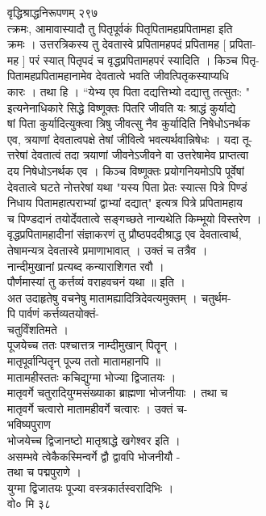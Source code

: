 \documentclass[11pt, openany]{book}
\begin{document}
{{{{{{{{ वृद्धिश्राद्धनिरूपणम् \textbar{} २९७\\
त्क्रमः, आमावास्यादौ तु पितृपूर्वकं पितृपितामहप्रपितामहा इति\\
क्रमः । उत्तरत्रिकस्य तु देवतास्वे प्रपितामहपदं प्रपितामह {[} प्रपिता-\\
मह {]} परं स्यात् पितृपदं च वृद्धप्रपितामहपरं स्यादिति । किञ्च पितृ-\\
पितामहप्रपितामहानामेव देवतात्वे भवति जीवत्पितृकस्याप्यधि\\
कारः । तथा हि । ``येभ्य एव पिता दद्यत्तिभ्यो दद्यात्तु तत्सुतः: "\\
इत्यनेनाधिकारे सिद्धे विष्णूक्तः पितरि जीवति यः श्राद्धं कुर्याद्ये\\
षां पिता कुर्यादित्युक्त्वा त्रिषु जीवत्सु नैव कुर्यादिति निषेधोऽनर्थक\\
एव, त्रयाणां देवतात्वपक्षे तेषां जीवित्वे भवत्यर्थवान्निषेधः । यदा तू-\\
त्तरेषां देवतात्वं तदा त्रयाणां जीवनेऽजीवने वा उत्तरेषामेव प्राप्तत्वा\\
दय निषेधोऽनर्थक एव । किञ्च विष्णूक्तः प्रयोगनियमोऽपि पूर्वेषां\\
देवतात्वे घटते नोत्तरेषां यथा "यस्य पिता प्रेतः स्यात्स पित्रे पिण्डं\\
निधाय पितामहात्पराभ्यां द्वाभ्यां दद्यात्" इत्यत्र पित्रे प्रपितामहाय\\
च पिण्डदानं तयोर्देवतात्वे सङ्गच्छते नान्यथेति किम्भूयो विस्तरेण ।\\
वृद्धप्रपितामहादीनां संज्ञाकरणं तु प्रौष्ठपददीश्राद्ध एव देवतात्वार्थ,\\
तेषामन्यत्र देवतास्वे प्रमाणाभावात् । उक्तं च तत्रैव ।\\
नान्दीमुखानां प्रत्यब्द कन्याराशिगत रवौ ।\\
पौर्णमास्यां तु कर्त्तव्यं वराहवचनं यथा ॥ इति ।\\
अत उदाहृतेषु वचनेषु मातामह्यादित्रिदेवत्यमुक्तम् । चतुर्थम-\\
पि पार्वणं कर्त्तव्यतयोक्तं-\\
चतुर्विंशतिमते ।\\
पूजयेच्च ततः पश्चात्तत्र नाम्दीमुखान् पितॄन् ।\\
मातृपूर्वान्पितॄन् पूज्य ततो मातामहानपि ॥\\
मातामहीस्ततः कचिद्युग्मा भोज्या द्विजातयः ।\\
मातृवर्गे चतुरादियुग्मसंख्याका ब्राह्मणा भोजनीयाः । तथा च\\
मातृवर्गे चत्वारो मातामहीवर्गे चत्वारः । उक्तं च-\\
भविष्यपुराण \textbar{}\\
भोजयेच्च द्विजानष्टो मातृश्राद्धे खगेश्वर \textbar{} इति ।\\
असम्भवे त्वेकैकस्मिन्वर्गे द्वौ द्वावपि भोजनीयौ -\\
तथा च पद्मपुराणे ।\\
युग्मा द्विजातयः पूज्या वस्त्रकार्तस्वरादिभिः ।\\
वो० मि ३८

}}}}}}}}
\end{document}
